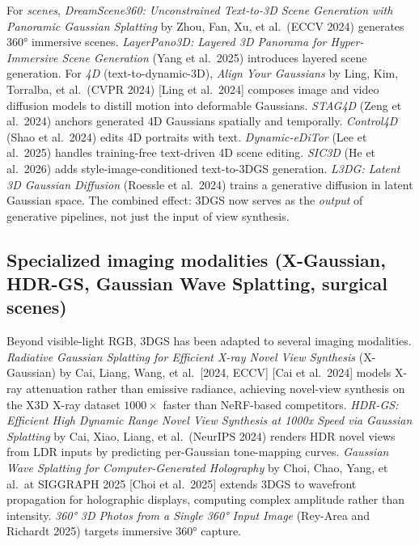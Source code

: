 For \emph{scenes}, \emph{DreamScene360: Unconstrained Text-to-3D Scene Generation with Panoramic Gaussian Splatting} by Zhou, Fan, Xu, et al.~(ECCV 2024) generates 360° immersive scenes. \emph{LayerPano3D: Layered 3D Panorama for Hyper-Immersive Scene Generation} (Yang et al.~2025) introduces layered scene generation. For \emph{4D} (text-to-dynamic-3D), \emph{Align Your Gaussians} by Ling, Kim, Torralba, et al.~(CVPR 2024) {[}Ling et al.~2024{]} composes image and video diffusion models to distill motion into deformable Gaussians. \emph{STAG4D} (Zeng et al.~2024) anchors generated 4D Gaussians spatially and temporally. \emph{Control4D} (Shao et al.~2024) edits 4D portraits with text. \emph{Dynamic-eDiTor} (Lee et al.~2025) handles training-free text-driven 4D scene editing. \emph{SIC3D} (He et al.~2026) adds style-image-conditioned text-to-3DGS generation. \emph{L3DG: Latent 3D Gaussian Diffusion} (Roessle et al.~2024) trains a generative diffusion in latent Gaussian space. The combined effect: 3DGS now serves as the \emph{output} of generative pipelines, not just the input of view synthesis.

\subsection{Specialized imaging modalities (X-Gaussian, HDR-GS, Gaussian Wave Splatting, surgical scenes)}\label{specialized-imaging-modalities-x-gaussian-hdr-gs-gaussian-wave-splatting-surgical-scenes}

Beyond visible-light RGB, 3DGS has been adapted to several imaging modalities. \emph{Radiative Gaussian Splatting for Efficient X-ray Novel View Synthesis} (X-Gaussian) by Cai, Liang, Wang, et al.~{[}2024, ECCV{]} {[}Cai et al.~2024{]} models X-ray attenuation rather than emissive radiance, achieving novel-view synthesis on the X3D X-ray dataset \(1000\times\) faster than NeRF-based competitors. \emph{HDR-GS: Efficient High Dynamic Range Novel View Synthesis at 1000x Speed via Gaussian Splatting} by Cai, Xiao, Liang, et al.~(NeurIPS 2024) renders HDR novel views from LDR inputs by predicting per-Gaussian tone-mapping curves. \emph{Gaussian Wave Splatting for Computer-Generated Holography} by Choi, Chao, Yang, et al.~at SIGGRAPH 2025 {[}Choi et al.~2025{]} extends 3DGS to wavefront propagation for holographic displays, computing complex amplitude rather than intensity. \emph{360° 3D Photos from a Single 360° Input Image} (Rey-Area and Richardt 2025) targets immersive 360° capture.

